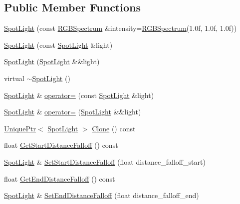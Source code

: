 \subsection*{Public Member Functions}
\begin{DoxyCompactItemize}
\item 
\hyperlink{classmage_1_1_spot_light_adc5c7b5fead1b7b0c8728ffd816a9ada}{Spot\+Light} (const \hyperlink{structmage_1_1_r_g_b_spectrum}{R\+G\+B\+Spectrum} \&intensity=\hyperlink{structmage_1_1_r_g_b_spectrum}{R\+G\+B\+Spectrum}(1.\+0f, 1.\+0f, 1.\+0f))
\item 
\hyperlink{classmage_1_1_spot_light_a597abd916ed14372be208a68eb01b871}{Spot\+Light} (const \hyperlink{classmage_1_1_spot_light}{Spot\+Light} \&light)
\item 
\hyperlink{classmage_1_1_spot_light_a3a5574f34f5b80cbeef00709f8a9d094}{Spot\+Light} (\hyperlink{classmage_1_1_spot_light}{Spot\+Light} \&\&light)
\item 
virtual \hyperlink{classmage_1_1_spot_light_aeeaba91c6448102ac6a23587c5366808}{$\sim$\+Spot\+Light} ()
\item 
\hyperlink{classmage_1_1_spot_light}{Spot\+Light} \& \hyperlink{classmage_1_1_spot_light_a04a23d643186a58fb3a03d0a73a63e39}{operator=} (const \hyperlink{classmage_1_1_spot_light}{Spot\+Light} \&light)
\item 
\hyperlink{classmage_1_1_spot_light}{Spot\+Light} \& \hyperlink{classmage_1_1_spot_light_ab79e4bf1c488c1a753f434a4d84567e5}{operator=} (\hyperlink{classmage_1_1_spot_light}{Spot\+Light} \&\&light)
\item 
\hyperlink{namespacemage_a8c307fbcc33bce9b7f2aa4c26c3b95cf}{Unique\+Ptr}$<$ \hyperlink{classmage_1_1_spot_light}{Spot\+Light} $>$ \hyperlink{classmage_1_1_spot_light_a1092a1238be8cfd771a43e6976d16270}{Clone} () const
\item 
float \hyperlink{classmage_1_1_spot_light_a78ef6cc0ecd04cff8a4db9270e9ecb99}{Get\+Start\+Distance\+Falloff} () const
\item 
\hyperlink{classmage_1_1_spot_light}{Spot\+Light} \& \hyperlink{classmage_1_1_spot_light_a0e31dd3527aafc860e7a5c31aaf673d1}{Set\+Start\+Distance\+Falloff} (float distance\+\_\+falloff\+\_\+start)
\item 
float \hyperlink{classmage_1_1_spot_light_a3e6767992846e17a9bebb66519c30f19}{Get\+End\+Distance\+Falloff} () const
\item 
\hyperlink{classmage_1_1_spot_light}{Spot\+Light} \& \hyperlink{classmage_1_1_spot_light_a58a1aeffdcee3e54038cd2f40edd8a52}{Set\+End\+Distance\+Falloff} (float distance\+\_\+falloff\+\_\+end)

\end{DoxyCompactItemize}
